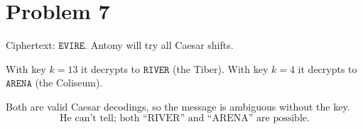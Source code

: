 \section*{Problem 7}

Ciphertext: \(\texttt{EVIRE}\). Antony will try all Caesar shifts.

With key \(k=13\) it decrypts to \(\texttt{RIVER}\) (the Tiber).  
With key \(k=4\) it decrypts to \(\texttt{ARENA}\) (the Coliseum).

Both are valid Caesar decodings, so the message is ambiguous without the key.
\[
\boxed{\text{He can't tell; both “RIVER” and “ARENA” are possible.}}
\]
